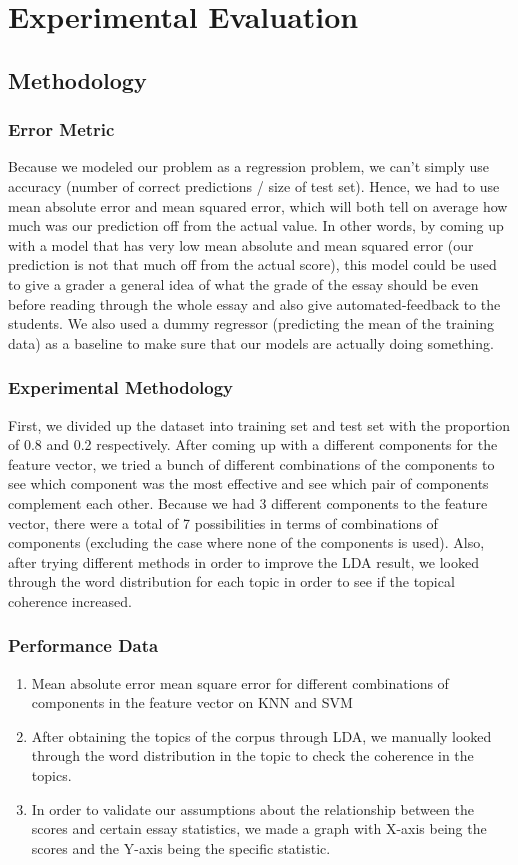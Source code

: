 \documentclass{article}
\begin{document}
\section{Experimental Evaluation}
\subsection{Methodology}
\subsubsection{Error Metric}
Because we modeled our problem as a regression problem, we can’t simply use accuracy (number of correct predictions / size of test set). Hence, we had to use mean absolute error and mean squared error, which will both tell on average how much was our prediction off from the actual value. In other words, by coming up with a model that has very low mean absolute and mean squared error (our prediction is not that much off from the actual score), this model could be used to give a grader a general idea of what the grade of the essay should be even before reading through the whole essay and also give automated-feedback to the students. 
We also used a dummy regressor (predicting the mean of the training data) as a baseline to make sure that our models are actually doing something.
\subsubsection{Experimental Methodology}
First, we divided up the dataset into training set and test set with the proportion of 0.8 and 0.2 respectively. 
After coming up with a different components for the feature vector, we tried a bunch of different combinations of the components to see which component was the most effective and see which pair of components complement each other. Because we had 3 different components to the feature vector, there were a total of 7 possibilities in terms of combinations of components (excluding the case where none of the components is used). 
Also, after trying different methods in order to improve the LDA result, we looked through the word distribution for each topic in order to see if the topical coherence increased.  
\subsubsection{Performance Data}
\begin{enumerate}
\setlength\itemsep{-0.1em}
	\item Mean absolute error mean square error for different combinations of components in the feature vector on KNN and SVM
	\item After obtaining the topics of the corpus through LDA, we manually looked through the word distribution in the topic to check the coherence in the topics.
	\item In order to validate our assumptions about the relationship between the scores and certain essay statistics, we made a graph with X-axis being the scores and the Y-axis being the specific statistic.
\end{enumerate}
\end{document}
